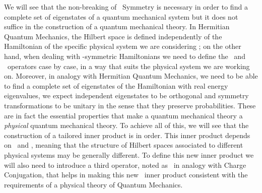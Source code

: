         We will see that the non-breaking of \PT\ Symmetry is necessary in order to find a complete set of eigenstates of a quantum mechanical system but it does not suffice in the construction of a quantum mechanical theory. In Hermitian Quantum Mechanics, the Hilbert space is defined independently of the Hamiltonian of the specific physical system we are considering \cite{bender2024}; on the other hand, when dealing with \PT-symmetric Hamiltonians we need to define the \hP\ and \hT\ operators case by case, in a way that suits the physical system we are working on. Moreover, in analogy with Hermitian Quantum Mechanics, we need to be able to find a complete set of eigenstates of the Hamiltonian with real energy eigenvalues, we expect independent eigenstates to be orthogonal and symmetry transformations to be unitary in the sense that they preserve probabilities. These are in fact the essential properties that make a quantum mechanical theory a \emph{physical} quantum mechanical theory. To achieve all of this, we will see that the construction of a tailored inner product is in order. This inner product depends on \hP\ and \hT, meaning that the structure of Hilbert spaces associated to different physical systems may be generally different. To define this new inner product we will also need to introduce a third operator, noted as \hC\ in analogy with Charge Conjugation, that helps in making this new \CPT\ inner product consistent with the requirements of a physical theory of Quantum Mechanics.

